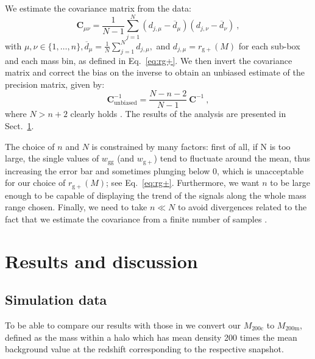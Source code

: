 \documentclass[a4paper,11pt]{article}
\begin{document}
We estimate the covariance matrix from the data:
\begin{equation}
     \mathbf{C}_{\mu \nu} = \frac{1}{N-1} \sum_{j = 1}^{N} (d_{j, \mu} - \overline{d}_{\mu})(d_{j, \nu} - \overline{d}_{\nu}) \ ,
	\label{eq:covariance}
\end{equation}
with $\mu, \nu \in \{1, \dotso, n\}, \overline{d}_{\mu} = \frac{1}{N} \sum_{j=1}^{N} d_{j, \mu},$ and $d_{j, \mu}= r_{\mathrm{g+}}(M)$ for each sub-box and each mass bin, as defined in Eq.~\ref{eq:rg+}. We then invert the covariance matrix and correct the bias on the inverse to obtain an unbiased estimate of the precision matrix, given by:
\begin{equation}
     \mathbf{C}^{-1}_{\mathrm{unbiased}} = \frac{N - n -2}{N-1} \  \mathbf{C}^{-1} \ ,
	\label{eq:precunbiased}
\end{equation}
where $N > n+2$ clearly holds \cite{Tayloretal2013}. The results of the analysis are presented in Sect.~\ref{sec:resanddiscuss}.

The choice of $n$ and $N$ is constrained by many factors: first of all, if N is too large, the single values of $w_{\mathrm{gg}}$ (and $w_{\mathrm{g+}}$) tend to fluctuate around the mean, thus increasing the error bar and sometimes plunging below 0, which is unacceptable for our choice of $ r_{\mathrm{g+}} (M)$; see Eq.~\ref{eq:rg+}. Furthermore, we want $n$ to be large enough to be capable of displaying the trend of the signals along the whole mass range chosen. Finally, we need to take $n \ll N$ to avoid divergences related to the fact that we estimate the covariance from a finite number of samples \cite{Tayloretal2013}.

\section{Results and discussion}
\label{sec:resanddiscuss}
\subsection{Simulation data}
\label{subsec:simdatard}
To be able to compare our results with those in \cite[figure 7]{vanUitertJoachimi2017} we convert our $M_{\mathrm{200c}}$ to $M_{\mathrm{200m}}$, defined as the mass within a halo which has mean density 200 times the mean background value at the redshift corresponding to the respective snapshot.
\end{document}
